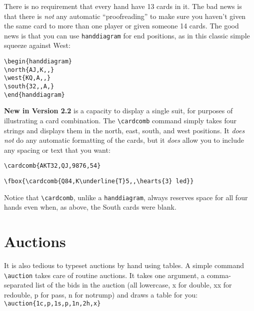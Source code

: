\documentclass[10pt]{article}%
\newcommand{\gap}{\vspace{\baselineskip}}
\begin{document}
\begin{handdiagram}
\end{handdiagram}

There is no requirement that every hand have 13 cards in it. The bad news is that there is \textit{not} any automatic ``proofreading'' to make sure you haven't given the same card to more than one player or given someone 14 cards. The good news is that you can use \verb+handdiagram+ for end positions, as in this classic simple squeeze against West: 

\begin{verbatim}
\begin{handdiagram} 
\north{AJ,K,,} 
\west{KQ,A,,} 
\south{32,,A,} 
\end{handdiagram}
\end{verbatim}

\gap
\begin{handdiagram} 
\end{handdiagram}
\gap

\textbf{New in Version 2.2} is a capacity to display a single suit, for purposes of illustrating a card combination. The \verb+\cardcomb+ command simply takes four strings and displays them in the north, east, south, and west positions. It \textit{does not} do any automatic formatting of the cards, but it \textit{does} allow you to include any spacing or text that you want:

\verb+\cardcomb{AKT32,QJ,9876,54}+ 

\gap\verb+\fbox{\cardcomb{Q84,K\underline{T}5,,\hearts{3} led}}+ 

Notice that \verb+\cardcomb+, unlike a \verb+handdiagram+, always reserves space for all four hands even when, as above, the South cards were blank.

\section{Auctions}

It is also tedious to typeset auctions by hand using tables. A simple command \verb+\auction+ takes care of routine auctions. It takes one argument, a comma-separated list of the bids in the auction (all lowercase, x for double, xx for redouble, p for pass, n for notrump) and draws a table for you: \verb+\auction{1c,p,1s,p,1n,2h,x}+
\end{document}
